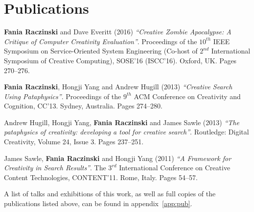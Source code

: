 
\pagestyle{empty}

\chapter{Publications}
\label{pre:pub}

\textbf{Fania Raczinski} and Dave Everitt (2016) \emph{``Creative Zombie Apocalypse: A Critique of Computer Creativity Evaluation''}. Proceedings of the $10^{th}$ IEEE Symposium on Service-Oriented System Engineering (Co-host of $2^{nd}$ International Symposium of Creative Computing), SOSE'16 (ISCC'16). Oxford, UK. Pages 270--276.

\textbf{Fania Raczinski}, Hongji Yang and Andrew Hugill (2013) \emph{``Creative Search Using Pataphysics''}. Proceedings of the $9^{th}$ ACM Conference on Creativity and Cognition, CC'13. Sydney, Australia. Pages 274--280.

Andrew Hugill, Hongji Yang, \textbf{Fania Raczinski} and James Sawle (2013) \emph{``The pataphysics of creativity: developing a tool for creative search''}. Routledge: Digital Creativity, Volume 24, Issue 3. Pages 237--251.

James Sawle, \textbf{Fania Raczinski} and Hongji Yang (2011) \emph{``A Framework for Creativity in Search Results''}. The $3^{rd}$ International Conference on Creative Content Technologies, CONTENT'11. Rome, Italy. Pages 54--57.

\spirals

A list of talks and exhibitions of this work, as well as full copies of the publications listed above, can be found in appendix~\ref{app:pub}.


\cleardoublepage
